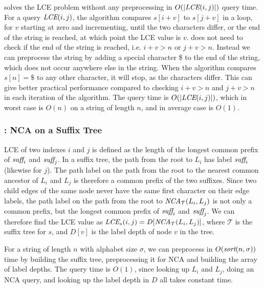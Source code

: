\documentclass[a4]{article}
\begin{document}
 solves the LCE problem without any preprocessing in $O(|\textit{LCE}(i,j)|)$ query time. For a query $\textit{LCE}(i,j)$, the algorithm compares $s[i+v]$ to $s[j+v]$ in a loop, for $v$ starting at zero and incrementing, until the two characters differ, or the end of the string is reached, at which point the LCE value is $v$.  does not need to check if the end of the string is reached, i.e. $i+v>n$ or $j+v>n$. Instead we can preprocess the string by adding a special character \$ to the end of the string, which does not occur anywhere else in the string. When the algorithm compares $s[n] = \$$ to any other character, it will stop, as the characters differ. This can give better practical performance compared to checking $i+v>n$ and $j+v>n$ in each iteration of the algorithm. The query time is $O(|\textit{LCE}(i,j)|)$, which in worst case is $O(n)$ on a string of length $n$, and in average case is $O(1)$.

\subsubsection{: NCA on a Suffix Tree}

LCE of two indexes $i$ and $j$ is defined as the length of the longest common prefix of $\textit{suff}_i$ and $\textit{suff}_j$. In a suffix tree, the path from the root to $L_i$ has label $\textit{suff}_i$ (likewise for $j$). The path label on the path from the root to the nearest common ancestor of $L_i$ and $L_j$ is therefore a common prefix of the two suffixes. Since two child edges of the same node never have the same first character on their edge labels, the path label on the path from the root to $\textit{NCA}_\mathcal{T}(L_i,L_j)$ is not only a common prefix, but the longest common prefix of $\textit{suff}_i$ and $\textit{suff}_j$. We can therefore find the LCE value as $\textit{LCE}_s(i,j) = D[\textit{NCA}_\mathcal{T}(L_i,L_j)]$, where $\mathcal{T}$ is the suffix tree for $s$, and $D[v]$ is the label depth of node $v$ in the tree.

For a string of length $n$ with alphabet size $\sigma$, we can preprocess  in $O(\textit{sort}(n,\sigma))$ time by building the suffix tree, preprocessing it for NCA and building the array of label depths. The query time is $O(1)$, since looking up $L_i$ and $L_j$, doing an NCA query, and looking up the label depth in $D$ all takes constant time.

\end{document}
